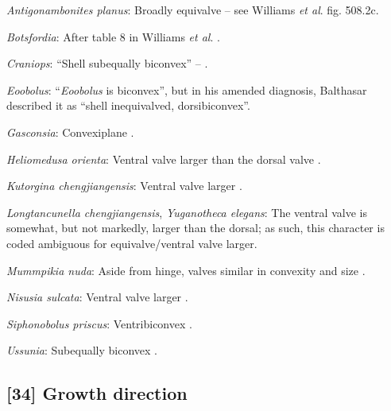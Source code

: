 \documentclass[openany]{book}
\theoremstyle{definition}
\theoremstyle{definition}
\theoremstyle{definition}
\theoremstyle{remark}
\begin{document}
\hypertarget{Antigonambonites_planus-coding-33}{}
\emph{Antigonambonites planus}: Broadly equivalve -- see Williams
\emph{et al}. \citeyearpar{Williams2000LinguliformeaCraniiformea} fig.
508.2c.

\hypertarget{Botsfordia-coding-33}{}
\emph{Botsfordia}: After table 8 in Williams \emph{et al}.
\citeyearpar{Williams2000LinguliformeaCraniiformea}.

\hypertarget{Craniops-coding-33}{}
\emph{Craniops}: ``Shell subequally biconvex'' --
\citet{Williams2000LinguliformeaCraniiformea}.

\hypertarget{Eoobolus-coding-33}{}
\emph{Eoobolus}: ``\emph{Eoobolus} is biconvex'', but in his amended
diagnosis, Balthasar \citeyearpar{Balthasar2009Thebrachiopod} described
it as ``shell inequivalved, dorsibiconvex''.

\hypertarget{Gasconsia-coding-33}{}
\emph{Gasconsia}: Convexiplane
\citep[p.~187]{Williams2000LinguliformeaCraniiformea}.

\hypertarget{Heliomedusa_orienta-coding-33}{}
\emph{Heliomedusa orienta}: Ventral valve larger than the dorsal valve
\citep[p.~659]{Zhang2009Architectureand}.

\hypertarget{Kutorgina_chengjiangensis-coding-33}{}
\emph{Kutorgina chengjiangensis}: Ventral valve larger \citep[see][fig.
125.]{Williams2000LinguliformeaCraniiformea}.

\hypertarget{Longtancunella_chengjiangensis-coding-33}{}
\emph{Longtancunella chengjiangensis}, \emph{Yuganotheca elegans}: The
ventral valve is somewhat, but not markedly, larger than the dorsal; as
such, this character is coded ambiguous for equivalve/ventral valve
larger.

\hypertarget{Mummpikia_nuda-coding-33}{}
\emph{Mummpikia nuda}: Aside from hinge, valves similar in convexity and
size \citep{Balthasar2008iMummpikia}.

\hypertarget{Nisusia_sulcata-coding-33}{}
\emph{Nisusia sulcata}: Ventral valve larger \citep[see][fig.
126.]{Williams2000LinguliformeaCraniiformea}.

\hypertarget{Siphonobolus_priscus-coding-33}{}
\emph{Siphonobolus priscus}: Ventribiconvex
\citep{Popov2009Earlyontogeny}.

\hypertarget{Ussunia-coding-33}{}
\emph{Ussunia}: Subequally biconvex
\citep[p.~192]{Williams2000LinguliformeaCraniiformea}.

\subsection*{{[}34{]} Growth direction}\label{growth-direction-1}
\end{document}
